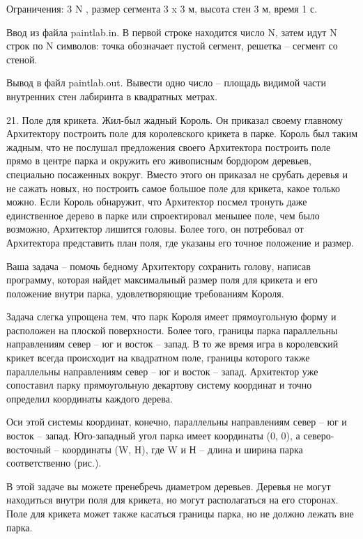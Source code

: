 \documentclass[]{article}
\begin{document}
Ограничения: 3 \leq N , размер сегмента 3 x 3 м, высота стен 3 м, время 1 с.

Ввод из файла paintlab.in. В первой строке находится число N, затем идут N строк по N символов: точка обозначает пустой сегмент, решетка – сегмент со стеной.

Вывод в файл paintlab.out. Вывести одно число – площадь видимой части внутренних стен лабиринта в квадратных метрах.



21. Поле для крикета. Жил-был жадный Король. Он приказал своему главному Архитектору построить поле для королевского крикета в парке. Король был таким жадным, что не послушал предложения своего Архитектора построить поле прямо в центре парка и окружить его живописным бордюром деревьев, специально посаженных вокруг. Вместо этого он приказал не срубать деревья и не сажать новых, но построить самое большое поле для крикета, какое только можно. Если Король обнаружит, что Архитектор посмел тронуть даже единственное дерево в парке или спроектировал меньшее поле, чем было возможно, Архитектор лишится головы. Более того, он потребовал от Архитектора представить план поля, где указаны его точное положение и размер.

Ваша задача – помочь бедному Архитектору сохранить голову, написав программу, которая найдет максимальный размер поля для крикета и его положение внутри парка, удовлетворяющие требованиям Короля.



Задача слегка упрощена тем, что парк Короля имеет прямоугольную форму и расположен на плоской поверхности. Более того, границы парка параллельны направлениям север – юг и восток – запад. В то же время игра в королевский крикет всегда происходит на квадратном поле, границы которого также параллельны направлениям север – юг и восток – запад. Архитектор уже сопоставил парку прямоугольную декартову систему координат и точно определил координаты каждого дерева.

Оси этой системы координат, конечно, параллельны направлениям север – юг и восток – запад. Юго-западный угол парка имеет координаты (0, 0), а северо-восточный – координаты (W, H), где W и Н – длина и ширина парка соответственно (рис.).

В этой задаче вы можете пренебречь диаметром деревьев. Деревья не могут находиться внутри поля для крикета, но могут располагаться на его сторонах. Поле для крикета может также касаться границы парка, но не должно лежать вне парка.
\end{document}
